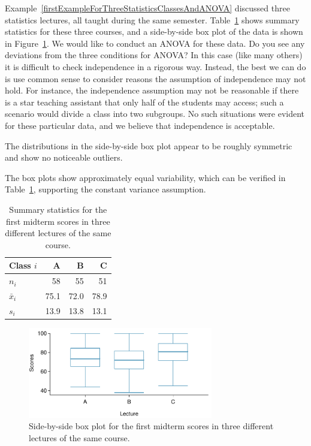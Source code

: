 \begin{example}{Example~\vref{firstExampleForThreeStatisticsClassesAndANOVA} discussed three statistics lectures, all taught during the same semester. Table~\ref{summaryStatisticsForClassTestData} shows summary statistics for these three courses, and a side-by-side box plot of the data is shown in Figure~\ref{classDataSBSBoxPlot}. We would like to conduct an ANOVA for these data. Do you see any deviations from the three conditions for ANOVA?}
In this case (like many others) it is difficult to check independence in a rigorous way. Instead, the best we can do is use common sense to consider reasons the assumption of independence may not hold. For instance, the independence assumption may not be reasonable if there is a star teaching assistant that only half of the students may access; such a scenario would divide a class into two subgroups. No such situations were evident for these particular data, and we believe that independence is acceptable.

The distributions in the side-by-side box plot appear to be roughly symmetric and show no noticeable outliers.

The box plots show approximately equal variability, which can be verified in Table~\ref{summaryStatisticsForClassTestData}, supporting the constant variance assumption.
\end{example}

\begin{table}
\centering
\begin{tabular}{lrrr}
  \hline
Class $i$	& A	& B	& C \\ 
  \hline
$n_i$		& 58	& 55	& 51 \\ 
$\bar{x}_i$	& 75.1	& 72.0	& 78.9 \\ 
$s_i$		& 13.9	& 13.8	& 13.1 \\ 
\hline
\end{tabular}
\caption{Summary statistics for the first midterm scores in three different lectures of the same course.}
\label{summaryStatisticsForClassTestData}
\end{table}

\begin{figure}
\centering
\includegraphics[width=0.72\textwidth]{ch_inference_for_means/figures/classData/classDataSBSBoxPlot}
\caption{Side-by-side box plot for the first midterm scores in three different  lectures of the same course.}
\label{classDataSBSBoxPlot}
\end{figure}

